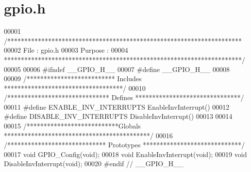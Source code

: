 \section{gpio.\+h}
\label{gpio_8h_source}

\begin{DoxyCode}
00001 \textcolor{comment}{/*********************************************************************}
00002 \textcolor{comment}{File    : gpio.h}
00003 \textcolor{comment}{Purpose : }
00004 \textcolor{comment}{**********************************************************************/}
00005 
00006 \textcolor{preprocessor}{#}\textcolor{preprocessor}{ifndef} \textcolor{preprocessor}{\_\_GPIO\_H\_\_}
00007 \textcolor{preprocessor}{#}\textcolor{preprocessor}{define} \textcolor{preprocessor}{\_\_GPIO\_H\_\_}
00008 
00009 \textcolor{comment}{/************************** Includes ***********************************/}
00010 \textcolor{comment}{/****************************** Defines *******************************/}
00011 \textcolor{preprocessor}{#}\textcolor{preprocessor}{define} \textcolor{preprocessor}{ENABLE\_INV\_INTERRUPTS}  \textcolor{preprocessor}{EnableInvInterrupt}\textcolor{preprocessor}{(}\textcolor{preprocessor}{)}
00012 \textcolor{preprocessor}{#}\textcolor{preprocessor}{define} \textcolor{preprocessor}{DISABLE\_INV\_INTERRUPTS} \textcolor{preprocessor}{DisableInvInterrupt}\textcolor{preprocessor}{(}\textcolor{preprocessor}{)}
00013 
00014 
00015 \textcolor{comment}{/***************************Globals *******************************************/}
00016 \textcolor{comment}{/***************************** Prototypes *****************************/}
00017 \textcolor{keywordtype}{void} GPIO_Config(\textcolor{keywordtype}{void});
00018 \textcolor{keywordtype}{void} EnableInvInterrupt(\textcolor{keywordtype}{void});
00019 \textcolor{keywordtype}{void} DisableInvInterrupt(\textcolor{keywordtype}{void});
00020 \textcolor{preprocessor}{#}\textcolor{preprocessor}{endif} \textcolor{comment}{// \_\_GPIO\_H\_\_}
\end{DoxyCode}
